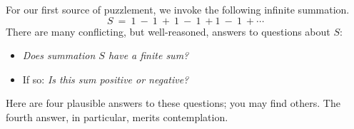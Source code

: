 \medskip

For our first source of puzzlement, we invoke the following infinite summation.
\[ S \ = \ 1 \ - \ 1 \ + \ 1 \ - \ 1 \ + 1 \ - \ 1 \ + \cdots \]
There are many conflicting, but well-reasoned, answers to questions about $S$:
\begin{itemize}
\item
{\it Does summation $S$ have a finite sum?} 
\medskip\item
If so: {\it Is this sum positive or negative?}
\end{itemize}

\smallskip


\noindent
Here are four plausible answers to these questions; you may find others.  The fourth answer, in particular, merits contemplation.
